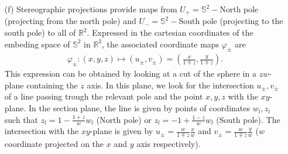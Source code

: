 \documentclass[10pt, a4paper]{article}
\begin{document}
{\begin{enumerate}
  \item[(f)] Stereographic projections provide maps from $U_{+} = \mathbb{S}^2-\text{North pole}$ (projecting from the north pole) and $U_{-} = \mathbb{S}^2-\text{South pole}$ (projecting to the south pole) to all of $\mathbb{R}^2$. Expressed in the cartesian coordinates of the embeding space of $\mathbb{S}^2$ in $\mathbb{R}^3$, the associated coordinate maps $\varphi_{\pm}$ are 
  \begin{align*}
    \varphi_\pm : (x, y, z) \mapsto (u_\pm, v_\pm) = \left(\frac{x}{1\mp z}, \frac{y}{1\mp z}\right).
  \end{align*} 
  This expression can be obtained by looking at a cut of the sphere in a $zw$-plane containing the $z$ axis. In this plane, we look for the intersection $u_\pm, v_\pm$ of a line passing trough the relevant pole and the point $x, y, z$ with the $xy$-plane. In the section plane, the line is given by points of coordinates $w_l, z_l$ such that $z_l = 1 - \frac{1+z}{w}w_l$ (North pole) or $z_l = -1 + \frac{1-z}{w} w_l$ (South pole). The intersection with the $xy$-plane is given by $u_\pm =\frac{w}{1\mp z} \frac{x}{w}$ and $v_\pm = \frac{w}{1\mp z} \frac{y}{w}$ ($w$ coordinate projected on the $x$ and $y$ axis respectively).


\end{enumerate}}
\end{document}
